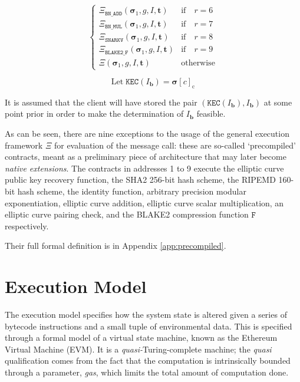 \documentclass[9pt,oneside]{amsart}
\begin{document}
\begin{multicols}{2}
\begin{equation}
\begin{cases}
\Xi_{\mathtt{BN\_ADD}}(\boldsymbol{\sigma}_1, g, I, \mathbf{t}) & \text{if} \quad r = 6 \\
\Xi_{\mathtt{BN\_MUL}}(\boldsymbol{\sigma}_1, g, I, \mathbf{t}) & \text{if} \quad r = 7 \\
\Xi_{\mathtt{SNARKV}}(\boldsymbol{\sigma}_1, g, I, \mathbf{t}) & \text{if} \quad r = 8 \\
\Xi_{\mathtt{BLAKE2\_F}}(\boldsymbol{\sigma}_1, g, I, \mathbf{t}) & \text{if} \quad r = 9 \\
\Xi(\boldsymbol{\sigma}_1, g, I, \mathbf{t}) & \text{otherwise} \end{cases}
\end{equation}

\begin{equation}
\text{Let} \; \mathtt{KEC}(I_{\mathbf{b}}) = \boldsymbol{\sigma}[c]_{\mathrm{c}}
\end{equation}

It is assumed that the client will have stored the pair $(\mathtt{KEC}(I_{\mathbf{b}}), I_{\mathbf{b}})$ at some point prior in order to make the determination of $I_{\mathbf{b}}$ feasible.

As can be seen, there are nine exceptions to the usage of the general execution framework $\Xi$ for evaluation of the message call: these are so-called `precompiled' contracts, meant as a preliminary piece of architecture that may later become \textit{native extensions}.
The contracts in addresses 1 to 9 execute the elliptic curve public key recovery function, the SHA2 256-bit hash scheme, the RIPEMD 160-bit hash scheme, the identity function, arbitrary precision modular exponentiation, elliptic curve addition, elliptic curve scalar multiplication, an elliptic curve pairing check, and the BLAKE2 compression function $\mathtt{F}$ respectively.

Their full formal definition is in Appendix \ref{app:precompiled}.

\section{Execution Model} \label{ch:model}

The execution model specifies how the system state is altered given a series of bytecode instructions and a small tuple of environmental data. This is specified through a formal model of a virtual state machine, known as the Ethereum Virtual Machine (EVM). It is a \textit{quasi-}Turing-complete machine; the \textit{quasi} qualification comes from the fact that the computation is intrinsically bounded through a parameter, \textit{gas}, which limits the total amount of computation done.


\end{multicols}
\end{document}
